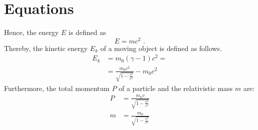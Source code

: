\Blindtext

\section{Equations}
\label{sec:Equations}

\blindtext
Hence, the energy \(E\) is defined as
\begin{equation}
    E = mc^2 \text{ .}
    \label{eq:sampleequation}
\end{equation}
Thereby, the kinetic energy \(E_k\) of a moving object is defined as follows.
\begin{equation}
    \begin{aligned}
        E_k &= m_0\left(\gamma - 1\right) c^2 =\\
        &= \frac{m_0 c^2}{\sqrt{1 - \frac{v^2}{c^2}}} - m_0 c^2
    \end{aligned}
\end{equation}
Furthermore, the total momentum \(P\) of a particle and the relativistic mass \(m\) are:
\begin{align}
    P &= \frac{m_0 v}{\sqrt{1 - \frac{v^2}{c^2}}}\\
    m &= \frac{m_0}{\sqrt{1 - \frac{v^2}{c^2}}}
\end{align}

\Blindtext
